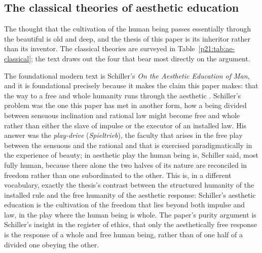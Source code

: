 \subsection{The classical theories of aesthetic education}
\label{p21:sub:ae-classical}

The thought that the cultivation of the human being passes essentially through the beautiful is old and deep, and the thesis of this paper is its inheritor rather than its inventor. The classical theories are surveyed in Table~\ref{p21:tab:ae-classical}; the text draws out the four that bear most directly on the argument.

The foundational modern text is Schiller's \emph{On the Aesthetic Education of Man}, and it is foundational precisely because it makes the claim this paper makes: that the way to a free and whole humanity runs through the aesthetic \parencite{schiller1967}. Schiller's problem was the one this paper has met in another form, how a being divided between sensuous inclination and rational law might become free and whole rather than either the slave of impulse or the executor of an installed law. His answer was the \emph{play-drive} (\emph{Spieltrieb}), the faculty that arises in the free play between the sensuous and the rational and that is exercised paradigmatically in the experience of beauty; in aesthetic play the human being is, Schiller said, most fully human, because there alone the two halves of its nature are reconciled in freedom rather than one subordinated to the other. This is, in a different vocabulary, exactly the thesis's contrast between the structured humanity of the installed rule and the free humanity of the aesthetic response: Schiller's aesthetic education is the cultivation of the freedom that lies beyond both impulse and law, in the play where the human being is whole. The paper's purity argument is Schiller's insight in the register of ethics, that only the aesthetically free response is the response of a whole and free human being, rather than of one half of a divided one obeying the other.

